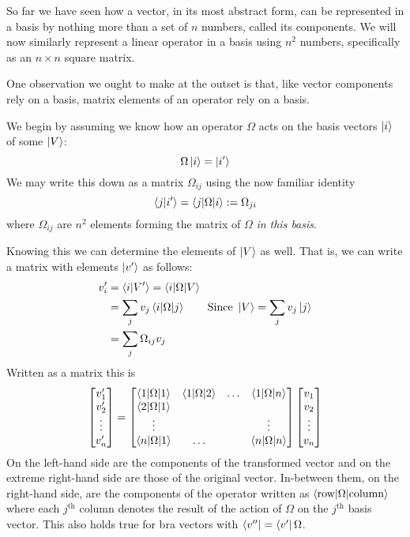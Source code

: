 \documentclass[english,seminar,headertitle]{lecture}
\begin{document}
So far we have seen how a vector, in its most abstract form, can be represented in a basis by nothing more than a set of $n$ numbers, called its components. We will now similarly represent a linear operator in a basis using $n^2$ numbers, specifically as an $n \times n$ square matrix.

One observation we ought to make at the outset is that, like vector components rely on a basis, matrix elements of an operator rely on a basis.

We begin by assuming we know how an operator $\Omega$ acts on the basis vectors $\ket{i}$ of some $\ket{V}$:
\[
	\Omega\ket{i} = \ket{i'}
\]
We may write this down as a matrix $\Omega_{ij}$ using the now familiar identity
\[
	\braket{j|i'} = \braket{j|\Omega | i} := \Omega_{ji}
\]
where $\Omega_{ij}$ are $n^2$ elements forming the matrix of $\Omega$ \textit{in this basis}.

Knowing this we can determine the elements of $\ket{V}$ as well. That is, we can write a matrix with elements $\ket{v'}$ as follows:
\begin{align*}
	v_i' &= \braket{i|V'} = \braket{i|\Omega|V} \\
		&= \sum_j v_j \braket{i|\Omega|j} \qquad\textrm{Since }\ket{V} = \sum_j  v_j\ket{j} \\
		&= \sum_j \Omega_{ij} v_j
\end{align*}
Written as a matrix this is
\begin{equation}
	\begin{bmatrix}
		v_1' \\ v_2' \\ \vdots \\ v_n'
	\end{bmatrix}
	=
	\begin{bmatrix}
		\braket{1|\Omega|1} & \braket{1|\Omega|2} & \ldots & \braket{1|\Omega|n} \\
		\braket{2|\Omega|1} & & & \\
		\vdots & & & \vdots \\
		\braket{n|\Omega|1} & \ldots & & \braket{n|\Omega|n}
	\end{bmatrix}
	\begin{bmatrix}
		v_1 \\ v_2 \\ \vdots \\ v_n
	\end{bmatrix}
	\label{eq:operator-as-matrix}
\end{equation}%
On the left-hand side are the components of the transformed vector and on the extreme right-hand side are those of the original vector. In-between them, on the right-hand side, are the components of the operator written as $\braket{\textrm{row}|\Omega|\textrm{column}}$ where each $j^\textrm{th}$ column denotes the result of the action of $\Omega$ on the $j^\textrm{th}$ basis vector. This also holds true for bra vectors with $\bra{v''} = \bra{v'}\Omega$.
\end{document}
